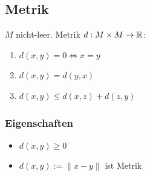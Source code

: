 \subsection*{Metrik}
$M$ nicht-leer. Metrik $d: M \times M \to \mathbb{R}$:
\begin{enumerate}
	\item $d(x,y)=0 \iff x=y$
	\item $d(x,y) = d(y,x)$
	\item $d(x,y) \le d(x,z) + d(z,y)$
\end{enumerate}
\subsubsection*{Eigenschaften}
\begin{itemize}
	\item $d(x,y) \ge 0$
	\item $d(x,y) := \|x-y\|$ ist Metrik
\end{itemize}
